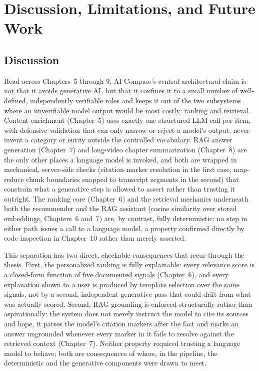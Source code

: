 \chapter{Discussion, Limitations, and Future Work}
\label{ch:discussion}

\section{Discussion}
\label{sec:disc-discussion}

Read across Chapters~5 through 9, AI Compass's central architectural claim is not that it avoids generative AI, but that it confines it to a small number of well-defined, independently verifiable roles and keeps it out of the two subsystems where an unverifiable model output would be most costly: ranking and retrieval. Content enrichment (Chapter~5) uses exactly one structured LLM call per item, with defensive validation that can only narrow or reject a model's output, never invent a category or entity outside the controlled vocabulary. RAG answer generation (Chapter~7) and long-video chapter summarization (Chapter~8) are the only other places a language model is invoked, and both are wrapped in mechanical, server-side checks (citation-marker resolution in the first case, map-reduce chunk boundaries snapped to transcript segments in the second) that constrain what a generative step is allowed to assert rather than trusting it outright. The ranking core (Chapter~6) and the retrieval mechanics underneath both the recommender and the RAG assistant (cosine similarity over stored embeddings, Chapters~6 and~7) are, by contrast, fully deterministic: no step in either path issues a call to a language model, a property confirmed directly by code inspection in Chapter~10 rather than merely asserted.

This separation has two direct, checkable consequences that recur through the thesis. First, the personalized ranking is fully explainable: every relevance score is a closed-form function of five documented signals (Chapter~6), and every explanation shown to a user is produced by template selection over the same signals, not by a second, independent generative pass that could drift from what was actually scored. Second, RAG grounding is enforced structurally rather than aspirationally: the system does not merely instruct the model to cite its sources and hope, it parses the model's citation markers after the fact and marks an answer ungrounded whenever every marker in it fails to resolve against the retrieved context (Chapter~7). Neither property required trusting a language model to behave; both are consequences of where, in the pipeline, the deterministic and the generative components were drawn to meet.

